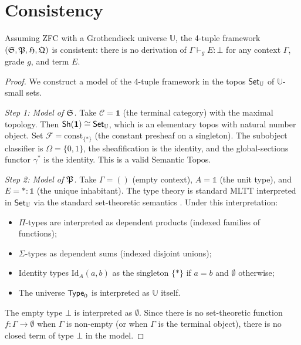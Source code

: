 \section{Consistency}
\label{sec:consistency}

\begin{theorem}
\label{thm:consistency}
Assuming ZFC with a Grothendieck universe $\mathbb{U}$, the 4-tuple
framework $(\mathfrak{S}, \mathfrak{P}, \mathfrak{H}, \mathfrak{Q})$ is consistent: there is no
derivation of $\Gamma \vdash_g E : \bot$ for any context $\Gamma$,
grade $g$, and term $E$.
\end{theorem}

\begin{proof}
We construct a model of the 4-tuple framework in the topos
$\mathsf{Set}_{\mathbb{U}}$ of $\mathbb{U}$-small sets.

\emph{Step 1: Model of $\mathfrak{S}$.}
Take $\mathcal{C} = \mathbf{1}$ (the terminal category) with the
maximal topology.  Then $\mathsf{Sh}(\mathbf{1}) \cong \mathsf{Set}_{\mathbb{U}}$,
which is an elementary topos with natural number object.  Set
$\mathcal{F} = \mathrm{const}_{\{*\}}$ (the constant presheaf on a
singleton).  The subobject classifier is $\Omega = \{0, 1\}$, the
sheafification is the identity, and the global-sections functor
$\gamma^*$ is the identity.  This is a valid Semantic Topos.

\emph{Step 2: Model of $\mathfrak{P}$.}
Take $\Gamma = ()$ (empty context), $A = \mathbb{1}$ (the unit
type), and $E = * : \mathbb{1}$ (the unique inhabitant).  The type
theory is standard MLTT interpreted in $\mathsf{Set}_{\mathbb{U}}$ via the
standard set-theoretic semantics \cite{mlm1984}.  Under this
interpretation:
\begin{itemize}[nosep]
\item $\Pi$-types are interpreted as dependent products (indexed
  families of functions);
\item $\Sigma$-types as dependent sums (indexed disjoint unions);
\item Identity types $\mathrm{Id}_A(a,b)$ as the singleton
  $\{*\}$ if $a = b$ and $\emptyset$ otherwise;
\item The universe $\mathsf{Type}_0$ is interpreted as $\mathbb{U}$ itself.
\end{itemize}
The empty type $\bot$ is interpreted as $\emptyset$.  Since there is
no set-theoretic function $f : \Gamma \to \emptyset$ when $\Gamma$
is non-empty (or when $\Gamma$ is the terminal object), there is no
closed term of type $\bot$ in the model.


\end{proof}
